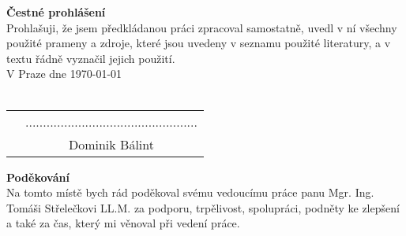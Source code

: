 \documentclass{article}
\begin{document}
 
\newpage
  \thispagestyle{empty}
  \vspace*{\fill}

\noindent \textbf{Čestné prohlášení} \\

Prohlašuji, že jsem předkládanou práci zpracoval samostatně, uvedl
v ní všechny použité prameny a zdroje, které jsou uvedeny v seznamu použité
literatury, a v textu řádně vyznačil jejich použití. \\

\noindent V Praze dne \today\\%
\vspace{10mm} \\
\begin{tabular}{p{11.5cm}c}
& ................................................. \\
& Dominik Bálint
\end{tabular}


\newpage

\thispagestyle{empty}

\vspace*{\fill}
\noindent \textbf{Poděkování} \\

	Na tomto místě bych rád poděkoval svému vedoucímu práce panu Mgr. Ing. 
Tomáši Střelečkovi LL.M. za podporu, trpělivost, spolupráci, podněty ke zlepšení a 
také za čas, který mi věnoval při vedení práce.

\vspace*{\fill}

\end{document}
